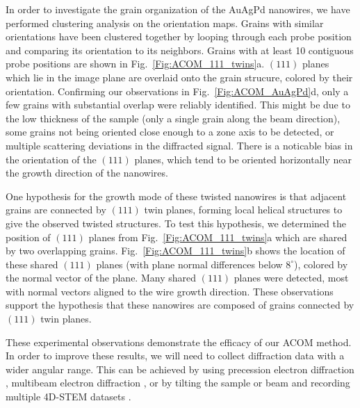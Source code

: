 \documentclass[%
 superscriptaddress,
 aip,
 amsmath,amssymb,
reprint,%
 author-year,%
longbibliography
]{revtex4-2}
\begin{document}
In order to investigate the grain organization of the AuAgPd nanowires, we have performed clustering analysis on the orientation maps. Grains with similar orientations have been clustered together by looping through each probe position and comparing its orientation to its neighbors. Grains with at least 10 contiguous probe positions are shown in Fig.~\ref{Fig:ACOM_111_twins}a. $(111)$ planes which lie in the image plane are overlaid onto the grain strucure, colored by their orientation. Confirming our observations in Fig.~\ref{Fig:ACOM_AuAgPd}d, only a few grains with substantial overlap were reliably identified. This might be due to the low thickness of the sample (only a single grain along the beam direction), some grains not being oriented close enough to a zone axis to be detected, or multiple scattering deviations in the diffracted signal. There is a noticable bias in the orientation of the $(111)$ planes, which tend to be oriented horizontally near the growth direction of the nanowires.


One hypothesis for the growth mode of these twisted nanowires is that adjacent grains are connected by $(111)$ twin planes, forming local helical structures to give the observed twisted structures. To test this hypothesis, we determined the position of $(111)$ planes from Fig.~\ref{Fig:ACOM_111_twins}a which are shared by two overlapping grains. Fig.~\ref{Fig:ACOM_111_twins}b shows the location of these shared $(111)$ planes (with plane normal differences below $8^\circ$), colored by the normal vector of the plane. Many shared $(111)$ planes were detected, most with normal vectors aligned to the wire growth direction. These observations support the hypothesis that these nanowires are composed of grains connected by $(111)$ twin planes.


These experimental observations demonstrate the efficacy of our ACOM method. In order to improve these results, we will need to collect diffraction data with a wider angular range. This can be achieved by using precession electron diffraction \citep{rouviere2013improved}, multibeam electron diffraction \cite{hong2021multibeam}, or by tilting the sample or beam and recording multiple 4D-STEM datasets \citep{meng2016three}.
\end{document}
